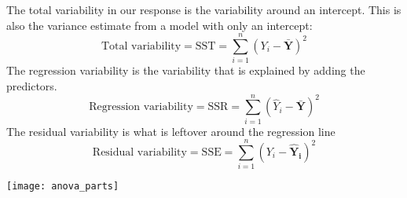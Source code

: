 The total variability in our response is the variability around an intercept. This
is also the variance estimate from a model with only an intercept:
\begin{equation}
    \text{Total variability} = \text{SST} = \sum_{i=1}^n (Y_i - \bm{\bar{Y}})^2
\end{equation}
The regression variability is the variability that is explained by adding the predictors.
\begin{equation}
    \text{Regression variability} = \text{SSR} = \sum_{i=1}^n (\hat{Y}_i - \bm{\bar{Y}})^2
\end{equation}
The residual variability is what is leftover around the regression line
\begin{equation}
    \text{Residual variability} = \text{SSE} = \sum_{i=1}^n (Y_i - \bm{\hat{Y}_i})^2
\end{equation}

\texttt{[image: anova\_parts]}


